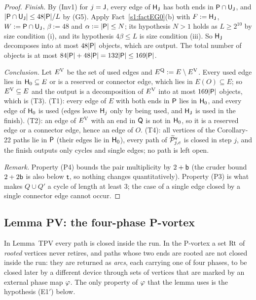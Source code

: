 \begin{proof}
\emph{Finish.} By (Inv1) for $j=\mathsf{J}$, every edge of $\mathsf{H}_{\mathsf{J}}$ has both ends in $\mathsf{P}\cap\mathsf{U}_{\mathsf{J}}$, and
$|\mathsf{P}\cap\mathsf{U}_{\mathsf{J}}|\le48|\mathsf{P}|/L$ by (G5). Apply Fact~\ref{s1:factEG0}(b) with $F:=\mathsf{H}_{\mathsf{J}}$, $W:=\mathsf{P}\cap\mathsf{U}_{\mathsf{J}}$,
$\beta:=48$ and $\alpha:=|\mathsf{P}|\le N$; its hypothesis $N>1$ holds as $L\ge2^{10}$ by size condition (i), and its hypothesis $4\beta\le L$ is size
condition (iii). So $\mathsf{H}_{\mathsf{J}}$ decomposes into at most
$48|\mathsf{P}|$ objects, which are output. The total number of objects is at most $84|\mathsf{P}|+48|\mathsf{P}|=132|\mathsf{P}|\le169|\mathsf{P}|$.

\emph{Conclusion.} Let $E^{\mathrm{V}}$ be the set of used edges and $E^{\mathrm{Q}}:=E\setminus E^{\mathrm{V}}$. Every used edge lies in $\mathsf{H}_0\subseteq
E$ or is a reserved or connector edge, which lies in $E(O)\subseteq E$; so $E^{\mathrm{V}}\subseteq E$ and the output is a
decomposition of $E^{\mathrm{V}}$ into at most $169|\mathsf{P}|$ objects, which is (T3).
(T1): every edge of $E$ with both ends in $\mathsf{P}$ lies in $\mathsf{H}_0$, and every edge of $\mathsf{H}_0$ is used (edges leave
$\mathsf{H}_j$ only by being used, and $\mathsf{H}_{\mathsf{J}}$ is used in the finish).
(T2): an edge of $E^{\mathrm{V}}$ with an end in $\mathsf{Q}$ is not in $\mathsf{H}_0$, so it is a reserved edge or a connector edge, hence an
edge of $O$.
(T4): all vertices of the Corollary-22 paths lie in $\mathsf{P}$ (their edges lie in $\mathsf{H}_0$), every path of
$\widetilde{\mathcal{P}}^{\mathsf{v}}_{j,c}$ is closed in step $j$, and the finish outputs only cycles and single edges; no path is left open.

\emph{Remark.} Property (P4) bounds the pair multiplicity by $2+\mathsf{b}$ (the cruder bound $2+2\mathsf{b}$ is also below
$\mathsf{t}$, so nothing changes quantitatively). Property (P3) is what makes $Q\cup Q'$ a cycle of length at least $3$; the
case of a single edge closed by a single connector edge cannot occur.
\end{proof}


\subsection{Lemma PV: the four-phase P-vortex}\label{s4:ssecPV}

In Lemma~TPV every path is closed inside the run. In the P-vortex a set $\mathrm{Rt}$ of \emph{rooted} vertices never
retires, and paths whose two ends are rooted are not closed inside the run: they are returned as \emph{arcs}, each
carrying one of four phases, to be closed later by a different device through sets of vertices that are marked by an
external phase map $\varphi$. The only property of $\varphi$ that the lemma uses is the hypothesis (E1$'$) below.

